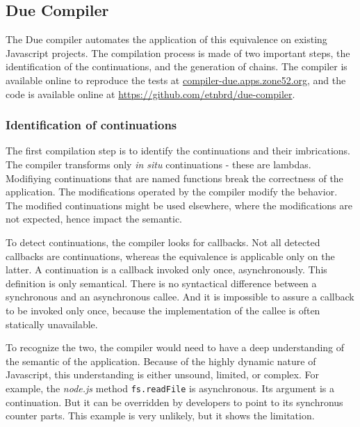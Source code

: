 \subsection{Due Compiler} \label{chapter5:due:compiler}

The Due compiler automates the application of this equivalence on existing Javascript projects.
The compilation process is made of two important steps, the identification of the continuations, and the generation of chains.
The compiler is available online to reproduce the tests at \url{compiler-due.apps.zone52.org}, and the code is available online at \url{https://github.com/etnbrd/due-compiler}.

\subsubsection{Identification of continuations}

The first compilation step is to identify the continuations and their imbrications.
The compiler transforms only \textit{in situ} continuations - these are lambdas.
Modifiying continuations that are named functions break the correctness of the application.
The modifications operated by the compiler modify the behavior.
The modified continuations might be used elsewhere, where the modifications are not expected, hence impact the semantic.

To detect continuations, the compiler looks for callbacks.
Not all detected callbacks are continuations, whereas the equivalence is applicable only on the latter.
A continuation is a callback invoked only once, asynchronously.
This definition is only semantical.
There is no syntactical difference between a synchronous and an asynchronous callee.
And it is impossible to assure a callback to be invoked only once, because the implementation of the callee is often statically unavailable.

To recognize the two, the compiler would need to have a deep understanding of the semantic of the application.
Because of the highly dynamic nature of Javascript, this understanding is either unsound, limited, or complex.
For example, the \textit{node.js} method \texttt{fs.readFile} is asynchronous.
Its argument is a continuation.
But it can be overridden by developers to point to its synchronus counter parts.
This example is very unlikely, but it shows the limitation.


